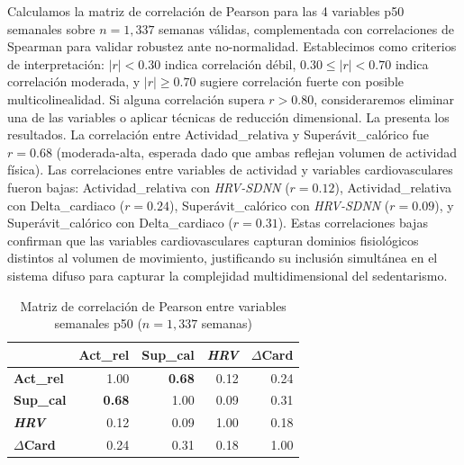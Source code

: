 Calculamos la matriz de correlación de Pearson para las 4 variables p50 semanales sobre $n=1,337$ semanas válidas, complementada con correlaciones de Spearman para validar robustez ante no-normalidad. Establecimos como criterios de interpretación: $|r| < 0.30$ indica correlación débil, $0.30 \leq |r| < 0.70$ indica correlación moderada, y $|r| \geq 0.70$ sugiere correlación fuerte con posible multicolinealidad. Si alguna correlación supera $r > 0.80$, consideraremos eliminar una de las variables o aplicar técnicas de reducción dimensional. La  presenta los resultados. La correlación entre Actividad\_relativa y Superávit\_calórico fue $r=0.68$ (moderada-alta, esperada dado que ambas reflejan volumen de actividad física). Las correlaciones entre variables de actividad y variables cardiovasculares fueron bajas: Actividad\_relativa con \textit{HRV-SDNN} ($r=0.12$), Actividad\_relativa con Delta\_cardiaco ($r=0.24$), Superávit\_calórico con \textit{HRV-SDNN} ($r=0.09$), y Superávit\_calórico con Delta\_cardiaco ($r=0.31$). Estas correlaciones bajas confirman que las variables cardiovasculares capturan dominios fisiológicos distintos al volumen de movimiento, justificando su inclusión simultánea en el sistema difuso para capturar la complejidad multidimensional del sedentarismo.

\begin{table}[H]
    \centering
    \caption{Matriz de correlación de Pearson entre variables semanales p50 ($n=1,337$ semanas)}
    \label{tab:correlation_matrix}
    \small
    \begin{tabular}{@{}lrrrr@{}}
        \toprule
         & \textbf{Act\_rel} & \textbf{Sup\_cal} & \textbf{\textit{HRV}} & \textbf{$\Delta$Card} \\
        \midrule
        \textbf{Act\_rel}     & 1.00 & \textbf{0.68} & 0.12 & 0.24 \\
        \textbf{Sup\_cal}     & \textbf{0.68} & 1.00 & 0.09 & 0.31 \\
        \textbf{\textit{HRV}}          & 0.12 & 0.09 & 1.00 & 0.18 \\
        \textbf{$\Delta$Card} & 0.24 & 0.31 & 0.18 & 1.00 \\
        \bottomrule
    \end{tabular}
\end{table}

\FloatBarrier


